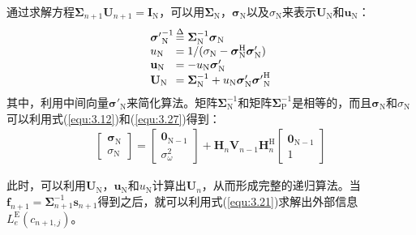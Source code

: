 通过求解方程$\boldsymbol{\Sigma}_{n+1}\mathbf{U}_{n+1}=\mathbf{I}_{\mathrm{N}}$，可以用$\boldsymbol{\Sigma}_{\mathrm{N}}$，$\boldsymbol{\sigma}_{\mathrm{N}}$以及$\sigma_{\mathrm{N}}$来表示$\mathbf{U}_{\mathrm{N}}$和$\mathbf{u}_{\mathrm{N}}$：
\begin{eqnarray}
    \begin{array}{l@{\,}l}
        {{\boldsymbol{\sigma}}'}_{\mathrm{N}}^{-1}&\overset{\Delta}{=}\boldsymbol{\Sigma}_{\mathrm{N}}^{-1}\boldsymbol{\sigma}_{\mathrm{N}}\\
        u_{\mathrm{N}}&=1/(\sigma_{\mathrm{N}}-\boldsymbol{\sigma}_{\mathrm{N}}^{\mathrm{H}}{\boldsymbol{\sigma}}'_{\mathrm{N}})\\
        \mathbf{u}_{\mathrm{N}}&=-u_{\mathrm{N}}{\boldsymbol{\sigma}}'_{\mathrm{N}}\\
        \mathbf{U}_{\mathrm{N}}&=\boldsymbol{\Sigma}_{\mathrm{N}}^{-1}+u_{\mathrm{N}}{\boldsymbol{\sigma}}'_{\mathrm{N}}{{\boldsymbol{\sigma}}'}_{\mathrm{N}}^{\mathrm{H}}
    \end{array}
    \label{equ:3.28}
\end{eqnarray}
其中，利用中间向量${\boldsymbol{\sigma}}'_{\mathrm{N}}$来简化算法。矩阵$\boldsymbol{\Sigma}_{\mathrm{N}}^{-1}$和矩阵$\boldsymbol{\Sigma}_{\mathrm{P}}^{-1}$是相等的，而且$\boldsymbol{\sigma}_{\mathrm{N}}$和$\sigma_{\mathrm{N}}$可以利用式(\ref{equ:3.12})和(\ref{equ:3.27})得到：
\begin{eqnarray}
    \begin{bmatrix}
        \boldsymbol{\sigma}_{\mathrm{N}}\\
        \sigma_{\mathrm{N}}
    \end{bmatrix}
    =
    \begin{bmatrix}
        \mathbf{0}_{\mathrm{N}-1}\\
        \sigma_{\omega}^2
    \end{bmatrix}
    +\mathbf{H}_n\mathbf{V}_{n-1}\mathbf{H}_n^{\mathrm{H}}
    \begin{bmatrix}
        \mathbf{0}_{\mathrm{N}-1}\\
        1
    \end{bmatrix}
    \label{equ:3.29}
\end{eqnarray}

此时，可以利用$\mathbf{U}_{\mathrm{N}}$，$\mathbf{u}_{\mathrm{N}}$和$u_{\mathrm{N}}$计算出$\mathbf{U}_n$，从而形成完整的递归算法。当$\mathbf{f}_{n+1}=\boldsymbol{\Sigma}_{n+1}^{-1}\mathbf{s}_{n+1}$得到之后，就可以利用式(\ref{equ:3.21})求解出外部信息$L_e^{\mathrm{E}}(c_{n+1,j})$。

